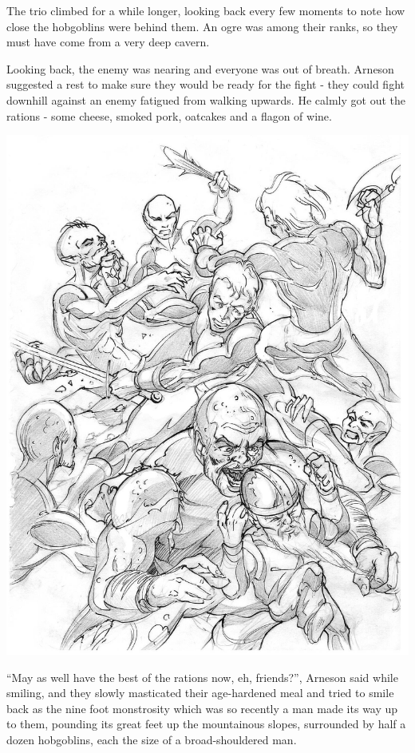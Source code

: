 \begin{multicols}{2}
{\begin{exampletext}
	The trio climbed for a while longer, looking back every few moments to note how close the hobgoblins were behind them. An ogre was among their ranks, so they must have come from a very deep cavern.

	Looking back, the enemy was nearing and everyone was out of breath.
	Arneson suggested a rest to make sure they would be ready for the fight - they could fight downhill against an enemy fatigued from walking upwards.
	He calmly got out the rations - some cheese, smoked pork, oatcakes and a flagon of wine.

	\noindent\includegraphics[width=\linewidth]{images/Boris_Pecikozic/nura_brawl.jpg}
	\label{boris:brawl}

	``May as well have the best of the rations now, eh, friends?'', Arneson said while smiling, and they slowly masticated their age-hardened meal and tried to smile back as the nine foot monstrosity which was so recently a man made its way up to them, pounding its great feet up the mountainous slopes, surrounded by half a dozen hobgoblins, each the size of a broad-shouldered man.


\end{exampletext}}
\end{multicols}
